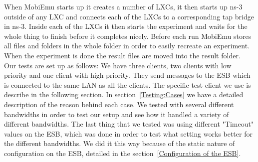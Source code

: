     When MobiEmu starts up it creates a number of LXCs, it then starts up ns-3 outside of any LXC and connects each of the LXCs to a corresponding tap bridge in ns-3. Inside each of the LXCs it then starts the experiment and waits for the whole thing to finish before it completes nicely. Before each run MobiEmu stores all files and folders in the whole folder in order to easily recreate an experiment. When the experiment is done the result files are moved into the result folder. \\
    
    Our tests are set up as follows: We have three clients, two clients with low priority and one client with high priority. They send messages to the ESB which is connected to the same LAN as all the clients. The specific test client we use is describe in the following section. In section~\ref{Testing:Cases} we have a detailed description of the reason behind each case. We tested with several different bandwidths in order to test our setup and see how it handled a variety of different bandwidths. The last thing that we tested was using different "Timeout" values on the ESB, which was done in order to test what setting works better for the different bandwidths. We did it this way because of the static nature of configuration on the ESB, detailed in the section~\ref{Configuration of the ESB}.
